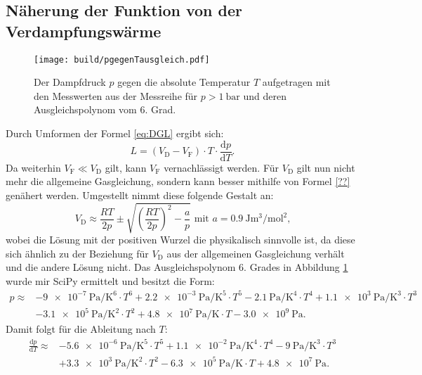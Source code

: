 \subsection{Näherung der Funktion von der Verdampfungswärme}

\begin{figure}
\centering
\caption{Der Dampfdruck $p$ gegen die absolute Temperatur $T$ aufgetragen mit den Messwerten aus der Messreihe für $p>\SI{1}{\bar}$ und deren Ausgleichspolynom vom 6. Grad.}
\texttt{[image: build/pgegenTausgleich.pdf]}
\label{fig:Graph3}
\end{figure}
Durch Umformen der Formel \eqref{eq:DGL} ergibt sich:
\begin{equation}
	L=(V_\text{D}-V_\text{F})\cdot T\cdot \frac{\text{d} p}{\text{d} T}\text{.}\label{eq:L}
\end{equation}
Da weiterhin $V_\text{F}\ll V_\text{D}$ gilt, kann $V_\text{F}$ vernachlässigt werden. Für $V_\text{D}$ gilt nun nicht mehr die allgemeine Gasgleichung, sondern kann besser mithilfe von Formel \eqref{??} genähert werden. Umgestellt nimmt diese folgende Gestalt an:
\begin{equation}
	V_\text{D} \approx \frac{R T}{2p} \pm \sqrt{\left(\frac{R T}{2p}\right)^2-\frac{a}{p}}\text{   mit }a=\SI{0.9}{\joule\meter\tothe{3}\per\mol\squared}\label{eq:VD}\text{,}
\end{equation}
wobei die Lösung mit der positiven Wurzel die physikalisch sinnvolle ist, da diese sich ähnlich zu der Beziehung für $V_\text{D}$ aus der allgemeinen Gasgleichung verhält und die andere Lösung nicht.
Das Ausgleichspolynom 6. Grades in Abbildung \ref{fig:Graph3} wurde mir SciPy \cite{scipy} ermittelt und besitzt die Form:
\begin{equation}
\begin{aligned}
p \approx &- \SI{9e-7}{\pascal\per\kelvin\tothe{6}} \cdot T^6 + \SI{2.2e-3}{\pascal\per\kelvin\tothe{5}} \cdot T^5 - \SI{2.1}{\pascal\per\kelvin\tothe{4}}\cdot T^4 + \SI{1.1e3}{\pascal\per\kelvin\tothe{3}} \cdot T^3 \\
&- \SI{3.1e5}{\pascal\per\kelvin\tothe{2}} \cdot T^2 + \SI{4.8e7}{\pascal\per\kelvin} \cdot T - \SI{3.0e9}{\pascal}\text{.}
\end{aligned}\label{eq:p}
\end{equation}
Damit folgt für die Ableitung nach $T$:
\begin{equation}
\begin{aligned}
\frac{\text{d} p}{\text{d} T} \approx &- \SI{5.6e-6}{\pascal\per\kelvin\tothe{5}} \cdot T^5 + \SI{1.1e-2}{\pascal\per\kelvin\tothe{4}}\cdot T^4 - \SI{9}{\pascal\per\kelvin\tothe{3}} \cdot T^3 \\
&+ \SI{3.3e3}{\pascal\per\kelvin\tothe{2}} \cdot T^2 - \SI{6.3e5}{\pascal\per\kelvin} \cdot T + \SI{4.8e7}{\pascal}\text{.}
\end{aligned}\label{eq:dpdT}
\end{equation}
